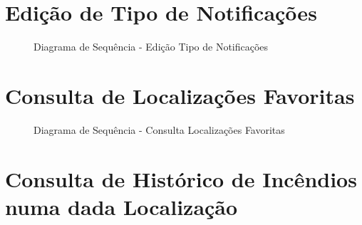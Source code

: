 \documentclass[a4paper,12pt]{scrreprt}
\begin{document}
\section{Edição de Tipo de Notificações}

\begin{figure}[hbt!]
    \centering
    \caption{Diagrama de Sequência - Edição Tipo de Notificações}
\end{figure}

\clearpage

\section{Consulta de Localizações Favoritas}

\begin{figure}[hbt!]
    \centering
    \caption{Diagrama de Sequência - Consulta Localizações Favoritas}
\end{figure}

\section{Consulta de Histórico de Incêndios numa dada Localização}
\end{document}
